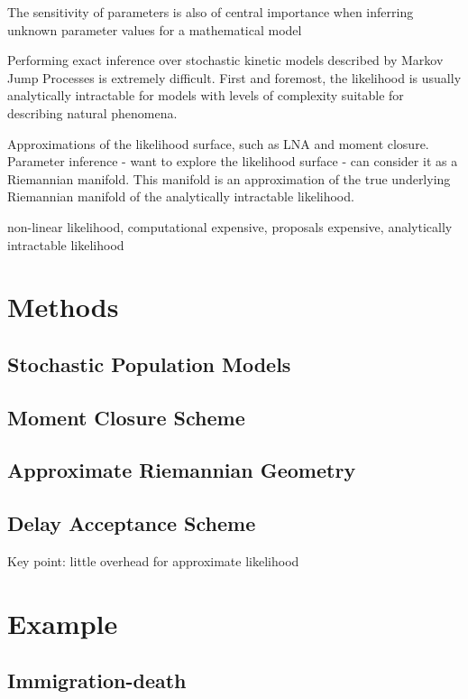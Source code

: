 \documentclass[useAMS,usenatbib,referee]{example/biom}
\begin{document}
The sensitivity of parameters is also of central importance when inferring unknown parameter values for a mathematical model

Performing exact inference over stochastic kinetic models described by Markov Jump Processes is extremely difficult.  First and foremost, the likelihood is usually analytically intractable for models with levels of complexity suitable for describing natural phenomena.

Approximations of the likelihood surface, such as LNA and moment closure.  Parameter inference - want to explore the likelihood surface - can consider it as a Riemannian manifold.  This manifold is an approximation of the true underlying Riemannian manifold of the analytically intractable likelihood.

non-linear likelihood, computational expensive, proposals expensive, analytically intractable likelihood


\section{Methods}

\subsection{Stochastic Population Models}

\subsection{Moment Closure Scheme}

\subsection{Approximate Riemannian Geometry}

\subsection{Delay Acceptance Scheme}

Key point: little overhead for approximate likelihood


\section{Example}

\subsection{Immigration-death}
\end{document}
